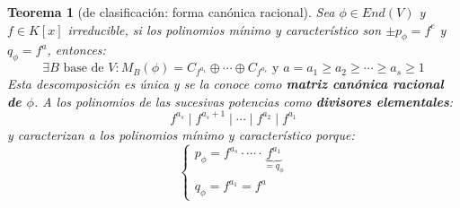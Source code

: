 \documentclass[10pt,a4paper,openright]{book}
\theoremstyle{break}
\newtheorem*{theo}{Teorema}
\begin{document}
\begin{theo}[de clasificación: forma canónica racional]
Sea $\phi\in End(V)$ y $f\in K[x]$ irreducible, si los polinomios mínimo y característico son $\pm p_\phi = f^e$ y $q_\phi = f^a$, entonces:
$$\exists B\mbox{ base de }V:M_B(\phi)= C_{f^{a_1}}\oplus \cdots \oplus C_{f^{a_s}}\mbox{ y } a=a_1\geq a_2 \geq \cdots \geq a_s\geq 1$$
Esta descomposición es única y se la conoce como \textbf{matriz canónica racional de $\phi$}. A los polinomios de las sucesivas potencias como \textbf{divisores elementales}:
$$f^{a_s}\mid f^{a_s +1} \mid \cdots \mid f^{a_2}\mid f^{a_1}$$
y caracterizan a los polinomios mínimo y característico porque:
$$\begin{cases}p_\phi = f^{a_s}\cdot \cdots \cdot \underbrace{f^{a_1}}_{= q_\phi} \\ q_\phi = f^{a_1} = f^a\end{cases}$$
\end{theo}
\end{document}
